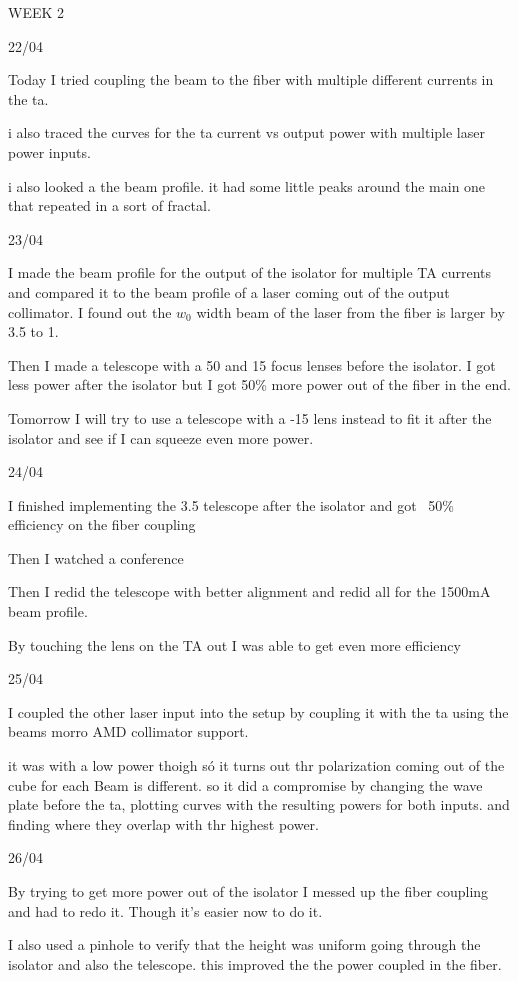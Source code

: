 WEEK 2

22/04

Today I tried coupling the beam to the fiber with multiple different currents in the ta. 

i also traced the curves for the ta current vs output power with multiple laser power inputs.

i also looked a the beam profile. it had some little peaks around the main one that repeated in a sort of fractal.

23/04

I made the beam profile for the output of the isolator for multiple TA currents and compared it to the beam profile of a laser coming out of the output collimator. I found out the $w_0$ width beam of the laser from the fiber is larger by 3.5 to 1.

Then I made a telescope with a 50 and 15 focus lenses before the isolator. I got less power after the isolator but I got 50\% more power out of the fiber in the end. 

Tomorrow I will try to use a telescope with a -15 lens instead to fit it after the isolator and see if I can squeeze even more power.

24/04

I finished implementing the 3.5 telescope after the isolator and got ~50\% efficiency on the fiber coupling

Then I watched a conference

Then I redid the telescope with better alignment and redid all for the 1500mA beam profile.

By touching the lens on the TA out I was able to get even more efficiency

25/04

I coupled the other laser input into the setup by coupling it with the ta using the beams morro AMD collimator support.

it was with a low power thoigh só it turns out thr polarization coming out of the cube for each Beam is different. so it did a compromise by changing the wave plate before the ta, plotting  curves with the resulting powers for both inputs. and finding where they overlap with thr highest power.

26/04

By trying to get more power out of the isolator I messed up the fiber coupling and had to redo it. Though it's easier now to do it.

I also used a pinhole to verify that the height was uniform going through the isolator and also the telescope. this improved the the power coupled in the fiber.

